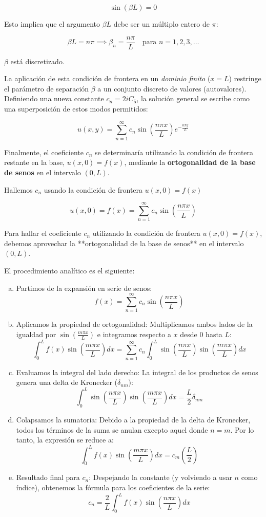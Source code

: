 \documentclass[a4paper]{article}
\begin{document}
$$\sin(\beta L) = 0$$

Esto implica que el argumento $\beta L$ debe ser un múltiplo entero de $\pi$:

$$\beta L = n\pi \implies \beta_n = \frac{n\pi}{L} \quad \text{para } n = 1, 2, 3, \dots$$

$\beta$ está discretizado.

La aplicación de esta condición de frontera en un \textit{dominio finito} ($x=L$) restringe el parámetro de separación $\beta$ a un conjunto discreto de valores (autovalores). Definiendo una nueva constante $c_n = 2i C_5$, la solución general se escribe como una superposición de estos modos permitidos:

$$u(x, y) = \sum_{n=1}^{\infty} c_n \sin\left(\frac{n\pi x}{L}\right) e^{-\frac{n\pi y}{L}}$$

Finalmente, el coeficiente $c_n$ se determinaría utilizando la condición de frontera restante en la base, $u(x, 0) = f(x)$, mediante la \textbf{ortogonalidad de la base de senos} en el intervalo $(0, L)$.

Hallemos $c_n$ usando la condición de frontera $u(x, 0) = f(x)$

$$u(x, 0) = f(x) = \sum_{n=1}^{\infty} c_n \sin\left(\frac{n\pi x}{L}\right)$$

Para hallar el coeficiente $c_n$ utilizando la condición de frontera $u(x, 0) = f(x)$, debemos aprovechar la **ortogonalidad de la base de senos** en el intervalo $(0, L)$.

El procedimiento analítico es el siguiente:

\begin{enumerate}[a.]
	\item Partimos de la expansión en serie de senos:
    $$f(x) = \sum_{n=1}^{\infty} c_n \sin\left(\frac{n\pi x}{L}\right)$$

	\item Aplicamos la propiedad de ortogonalidad:
    Multiplicamos ambos lados de la igualdad por $\sin\left(\frac{m\pi x}{L}\right)$ e integramos respecto a $x$ desde $0$ hasta $L$:
    $$\int_0^L f(x) \sin\left(\frac{m\pi x}{L}\right) dx = \sum_{n=1}^{\infty} c_n \int_0^L \sin\left(\frac{n\pi x}{L}\right) \sin\left(\frac{m\pi x}{L}\right) dx$$

	\item Evaluamos la integral del lado derecho:
    La integral de los productos de senos genera una delta de Kronecker ($\delta_{nm}$):
    $$\int_0^L \sin\left(\frac{n\pi x}{L}\right) \sin\left(\frac{m\pi x}{L}\right) dx = \frac{L}{2} \delta_{nm}$$

	\item Colapsamos la sumatoria:
    Debido a la propiedad de la delta de Kronecker, todos los términos de la suma se anulan excepto aquel donde $n = m$. Por lo tanto, la expresión se reduce a:
    $$\int_0^L f(x) \sin\left(\frac{m\pi x}{L}\right) dx = c_m \left( \frac{L}{2} \right)$$

	\item Resultado final para $c_n$:
    Despejando la constante (y volviendo a usar $n$ como índice), obtenemos la fórmula para los coeficientes de la serie:
    $$c_n = \frac{2}{L} \int_0^L f(x) \sin\left(\frac{n\pi x}{L}\right) dx$$
\end{enumerate}
\end{document}
